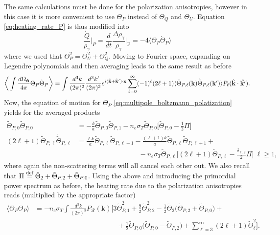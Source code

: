 The same calculations must be done for the polarization anisotropies, however in this case it is more convenient to use $\Theta_P$ instead of $\Theta_Q$ and $\Theta_U$. Equation \eqref{eq:heating_rate_P} is thus modified into $$\frac{\dot Q}{\rho_\gamma}\bigg|_P=\frac{d}{dt}\frac{\Delta \rho_\gamma}{\rho_\gamma}\bigg|_\text{P}=-4\langle\Theta_P\dot \Theta_P\rangle$$
where we used that $\Theta_P^2=\Theta_U^2+\Theta_Q^2$. Moving to Fourier space, expanding on Legendre polynomials and then averaging leads to the same result as before 
\begin{align*}
    \bigg\langle\int\frac{d\Omega_{\mathbf{\hat{n}}}}{4\pi}\Theta_P\dot \Theta_P\bigg\rangle=\int\frac{d^3k}{(2\pi)^3}\frac{d^3k'}{(2\pi)^3}e^{i(\mathbf{\hat{k}}+\mathbf{\hat{k}}')\cdot\mathbf{x}}\sum_{\ell=0}^{\infty}(-1)^\ell(2\ell+1)\langle\tilde\Theta_{P,\ell}(\mathbf{k})\dot{\tilde\Theta}_{P,\ell}(\mathbf{k}')\rangle P_\ell(\mathbf{\hat{k}}\cdot\mathbf{\hat{k'}}).
\end{align*}
Now, the equation of motion for $\Theta_P$ \eqref{eq:multipole_boltzmann_polatization} yields for the averaged products
\begin{align*}
    \tilde{\Theta}_{P,0}\dot{\tilde{\Theta}}_{P,0}&=-\frac{k}{a}\tilde{\Theta}_{P,0}\tilde{\Theta}_{P,1}-n_e\sigma_T\tilde{\Theta}_{P,0}\bigg[\tilde\Theta_{P,0}-\frac{1}{2}\Pi\bigg]\\
     (2\ell+1)\tilde{\Theta}_{P,\ell}\dot{\tilde{\Theta}}_{P,\ell}&=\frac{\ell k}{a}\tilde{\Theta}_{P,\ell}\tilde\Theta_{P,\ell-1}-\frac{(\ell+1)k}{a}\tilde{\Theta}_{P,\ell}\tilde\Theta_{P,\ell+1}+\\&\qquad\quad\qquad\qquad\qquad-n_e\sigma_T\tilde{\Theta}_{P,\ell}\bigg[(2\ell+1)\tilde\Theta_{P,\ell}-\frac{\delta_{\ell,2}}{2}\Pi\bigg]\ \ell\geq 1,
 \end{align*}
where again the non-scattering terms will all cancel each other out. We also recall that $\Pi\stackrel{\text{def}}{=}\tilde\Theta_2+\tilde\Theta_{P,2}+\tilde\Theta_{P,0}$. Using the above and introducing the primordial power spectrum as before, the heating rate due to the polarization anisotropies reads (multiplied by the appropriate factor)
\begin{align}
    \langle\Theta_P\dot \Theta_P\rangle&=-n_e\sigma_T\int\frac{d^3k}{(2\pi)^3}{P}_\mathcal{R} (\mathbf{k})\bigg[3\tilde\Theta_{P,1}^2+\frac{9}{2}\tilde\Theta_{P,2}^2-\frac{1}{2}\tilde\Theta_2\big(\tilde\Theta_{P,2}+\tilde\Theta_{P,0}\big)+\nonumber\\&\qquad\qquad\qquad\qquad\qquad\qquad+\frac{1}{2}\tilde\Theta_{P,0}\big(\tilde\Theta_{P,0}-\tilde\Theta_{P,2}\big)+\sum_{\ell=3}^{\infty}(2\ell+1)\tilde\Theta_\ell^2\bigg].
    \label{eq:TT_P_average_scalar}
\end{align}
